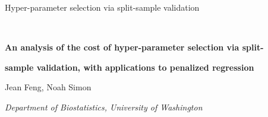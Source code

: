 \documentclass[12pt]{article} %
\theoremstyle{definition}
\begin{document}

\renewcommand{\baselinestretch}{2}


{\hfill {\footnotesize\rm Hyper-parameter selection via split-sample validation} \hfill}

\renewcommand{\thefootnote}{}
$\ $\par


\fontsize{12}{14pt plus.8pt minus .6pt}\selectfont \vspace{0.8pc}
\centerline{\large\bf An analysis of the cost of hyper-parameter selection via split-}
\vspace{2pt} \centerline{\large\bf sample validation, with applications to penalized regression}
\vspace{.4cm} \centerline{Jean Feng, Noah Simon} \vspace{.4cm} \centerline{\it
Department of Biostatistics, University of Washington} \vspace{.55cm} \fontsize{9}{11.5pt plus.8pt minus
.6pt}\selectfont

\end{document}
